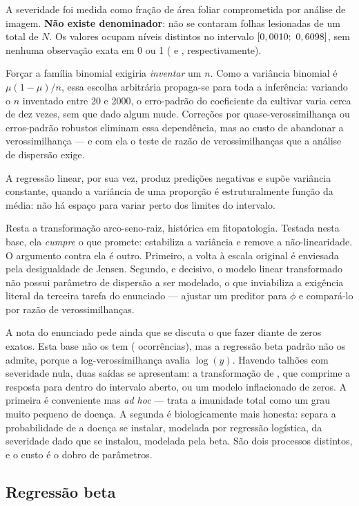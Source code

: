 A severidade foi medida como fração de área foliar comprometida por análise de imagem.
\textbf{Não existe denominador}: não se contaram folhas lesionadas de um total de $N$.
Os \baseN{} valores ocupam \bYdistintos{} níveis distintos no intervalo
$[0,0010;\ 0,6098]$, sem nenhuma observação exata em 0 ou 1
(\bYzeros{} e \bYuns{}, respectivamente).

Forçar a família binomial exigiria \emph{inventar} um $n$. Como a variância binomial é
$\mu(1-\mu)/n$, essa escolha arbitrária propaga-se para toda a inferência: variando o $n$
inventado entre 20 e 2000, o erro-padrão do coeficiente da cultivar varia cerca de dez
vezes, sem que dado algum mude. Correções por quase-verossimilhança ou erros-padrão
robustos eliminam essa dependência, mas ao custo de abandonar a verossimilhança --- e com
ela o teste de razão de verossimilhanças que a análise de dispersão exige.

A regressão linear, por sua vez, produz predições negativas e supõe variância constante,
quando a variância de uma proporção é estruturalmente função da média: não há espaço para
variar perto dos limites do intervalo.

Resta a transformação arco-seno-raiz, histórica em fitopatologia. Testada nesta base, ela
\emph{cumpre} o que promete: estabiliza a variância e remove a não-linearidade. O
argumento contra ela é outro. Primeiro, a volta à escala original é enviesada pela
desigualdade de Jensen. Segundo, e decisivo, o modelo linear transformado não possui
parâmetro de dispersão a ser modelado, o que inviabiliza a exigência literal da terceira
tarefa do enunciado --- ajustar um preditor para $\phi$ e compará-lo por razão de
verossimilhanças.

A nota do enunciado pede ainda que se discuta o que fazer diante de zeros exatos. Esta
base não os tem (\bYzeros{} ocorrências), mas a regressão beta padrão não os admite,
porque a log-verossimilhança avalia $\log(y)$. Havendo talhões com severidade nula, duas
saídas se apresentam: a transformação de \textcite{smithson2006}, que comprime a resposta
para dentro do intervalo aberto, ou um modelo inflacionado de zeros. A primeira é
conveniente mas \emph{ad hoc} --- trata a imunidade total como um grau muito pequeno de
doença. A segunda é biologicamente mais honesta: separa a probabilidade de a doença se
instalar, modelada por regressão logística, da severidade dado que se instalou, modelada
pela beta. São dois processos distintos, e o custo é o dobro de parâmetros.

\subsection{Regressão beta}

